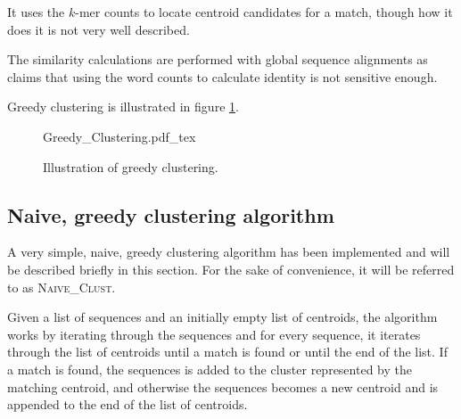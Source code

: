 It uses the $k$-mer counts to locate centroid candidates for a match, though
how it does it is not very well described.

The similarity calculations are performed with global sequence alignments as
\cite{usearch} claims that using the word counts to calculate identity is not
sensitive enough.

Greedy clustering is illustrated in figure \ref{fig:greedy_clustering}.

\begin{figure}[h!]
  \centering
  \def\svgwidth{\columnwidth}
  {Greedy_Clustering.pdf_tex}
  \caption{Illustration of greedy clustering.}
  \label{fig:greedy_clustering}
\end{figure}







\subsection{Naive, greedy clustering algorithm}

A very simple, naive, greedy clustering algorithm has been implemented and will
be described briefly in this section. For the sake of convenience, it will be
referred to as \textsc{Naive\_Clust}.

Given a list of sequences and an initially empty list of centroids, the
algorithm works by iterating through the sequences and for every sequence, it
iterates through the list of centroids until a match is found or until the end
of the list. If a match is found, the sequences is added to the cluster
represented by the matching centroid, and otherwise the sequences becomes a new
centroid and is appended to the end of the list of centroids.


